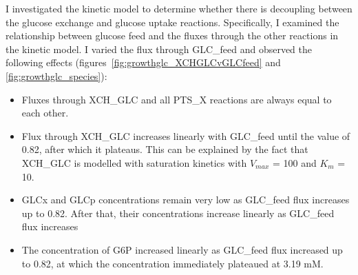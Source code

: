 \documentclass[parskip=full, numbers=noenddot]{scrreprt}
\begin{document}

I investigated the kinetic model to determine whether there is decoupling between the glucose exchange and glucose uptake reactions.
Specifically, I examined the relationship between glucose feed and the fluxes through the other reactions in the kinetic model. I varied the flux through GLC\_feed and observed the following effects (figures~\ref{fig:growthglc_XCHGLCvGLCfeed} and \ref{fig:growthglc_species}):

\begin{itemize}
\item Fluxes through XCH\_GLC and all PTS\_X reactions are always equal to each other.
\item Flux through XCH\_GLC increases linearly with GLC\_feed until the value of 0.82, after which it plateaus. This can be explained by the fact that XCH\_GLC is modelled with saturation kinetics with $V_{max}$ = 100 and $K_{m}$ = 10.
\item GLCx and GLCp concentrations remain very low as GLC\_feed flux increases up to 0.82. After that, their concentrations increase linearly as GLC\_feed flux increases
  \item The concentration of G6P increased linearly as GLC\_feed flux increased up to 0.82, at which the concentration immediately plateaued at 3.19 mM.
\end{itemize}
\end{document}

